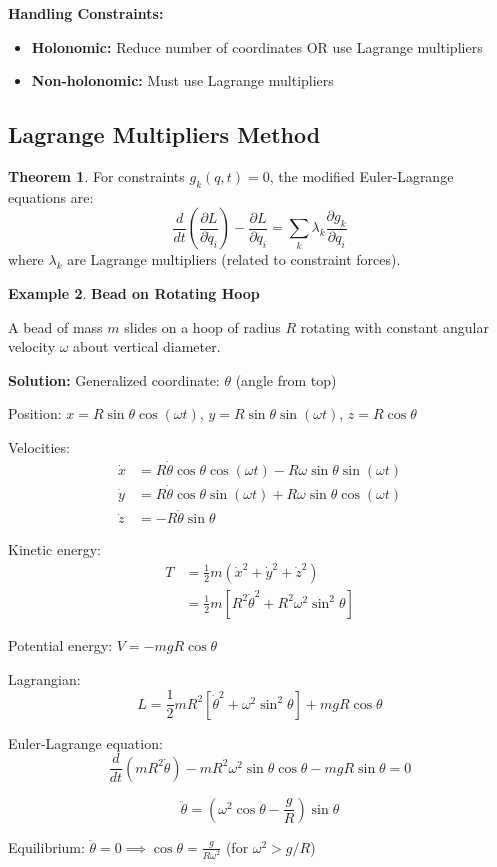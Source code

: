 \documentclass[12pt,a4paper]{article}
\theoremstyle{definition}
\newtheorem{theorem}{Theorem}[section]
\newtheorem{example}[theorem]{Example}
\begin{document}
\begin{tipbox}
\textbf{Handling Constraints:}
\begin{itemize}
    \item \textbf{Holonomic:} Reduce number of coordinates OR use Lagrange multipliers
    \item \textbf{Non-holonomic:} Must use Lagrange multipliers
\end{itemize}
\end{tipbox}

\subsection{Lagrange Multipliers Method}

\begin{theorem}
For constraints $g_k(q, t) = 0$, the modified Euler-Lagrange equations are:
\[
\frac{d}{dt}\left(\frac{\partial L}{\partial \dot{q}_i}\right) - \frac{\partial L}{\partial q_i} = \sum_k \lambda_k \frac{\partial g_k}{\partial q_i}
\]
where $\lambda_k$ are Lagrange multipliers (related to constraint forces).
\end{theorem}

\begin{example}
\textbf{Bead on Rotating Hoop}

A bead of mass $m$ slides on a hoop of radius $R$ rotating with constant angular velocity $\omega$ about vertical diameter.

\textbf{Solution:}
Generalized coordinate: $\theta$ (angle from top)

Position: $x = R\sin\theta\cos(\omega t)$, $y = R\sin\theta\sin(\omega t)$, $z = R\cos\theta$

Velocities:
\begin{align*}
\dot{x} &= R\dot{\theta}\cos\theta\cos(\omega t) - R\omega\sin\theta\sin(\omega t) \\
\dot{y} &= R\dot{\theta}\cos\theta\sin(\omega t) + R\omega\sin\theta\cos(\omega t) \\
\dot{z} &= -R\dot{\theta}\sin\theta
\end{align*}

Kinetic energy:
\begin{align*}
T &= \frac{1}{2}m(\dot{x}^2 + \dot{y}^2 + \dot{z}^2) \\
&= \frac{1}{2}m[R^2\dot{\theta}^2 + R^2\omega^2\sin^2\theta]
\end{align*}

Potential energy: $V = -mgR\cos\theta$

Lagrangian:
\[
L = \frac{1}{2}mR^2[\dot{\theta}^2 + \omega^2\sin^2\theta] + mgR\cos\theta
\]

Euler-Lagrange equation:
\[
\frac{d}{dt}(mR^2\dot{\theta}) - mR^2\omega^2\sin\theta\cos\theta - mgR\sin\theta = 0
\]

\[
\ddot{\theta} = (\omega^2\cos\theta - \frac{g}{R})\sin\theta
\]

Equilibrium: $\ddot{\theta} = 0 \implies \cos\theta = \frac{g}{R\omega^2}$ (for $\omega^2 > g/R$)
\end{example}
\end{document}
